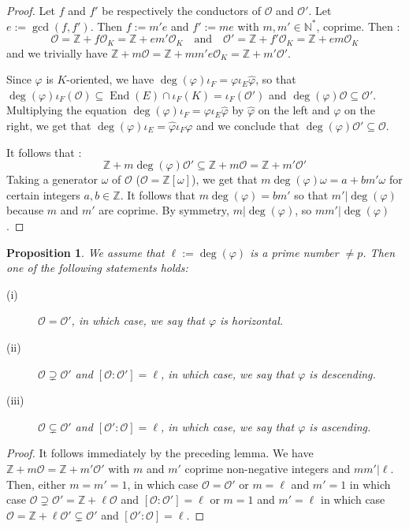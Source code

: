 \documentclass[a4paper,10pt]{report}
\theoremstyle{definition}
\theoremstyle{plain}
\newtheorem{proposition}[definition]{Proposition}
\theoremstyle{definition}
\newcommand{\N}{\mathbb{N}}
\newcommand{\Z}{\mathbb{Z}}
\newcommand{\mO}{\mathcal{O}}
\renewcommand{\(}{\left(}
\renewcommand{\)}{\right)}
\DeclareMathOperator{\End}{End}
\begin{document}
\begin{proof}
Let $f$ and $f'$ be respectively the conductors of $\mO$ and $\mO'$.  Let $e:=\gcd(f,f')$.  Then $f:=m'e$ and $f':=me$ with $m,m'\in\N^*$,  coprime.  Then :
\[\mO=\Z+f\mO_K=\Z+em'\mO_K \quad \mbox{and} \quad \mO'=\Z+f'\mO_K=\Z+em\mO_K\]
and we trivially have $\Z+m\mO=\Z+mm'e\mO_K=\Z+m'\mO'$.

Since $\varphi$ is $K$-oriented,  we have $\deg(\varphi)\iota_F=\varphi\iota_E\widehat{\varphi}$,  so that $\deg(\varphi)\iota_F(\mO)\subseteq \End(E)\cap\iota_F(K)=\iota_F(\mO')$ and $\deg(\varphi)\mO\subseteq \mO'$.  Multiplying the equation $\deg(\varphi)\iota_F=\varphi\iota_E\widehat{\varphi}$ by $\widehat{\varphi}$ on the left and $\varphi$ on the right, we get that $\deg(\varphi)\iota_E=\widehat{\varphi}\iota_F\varphi$ and we conclude that $\deg(\varphi)\mO'\subseteq \mO$. 

It follows that :
\[\Z+m\deg(\varphi)\mO'\subseteq \Z+m\mO= \Z+m'\mO'\]
Taking a generator $\omega$ of $\mO$ ($\mO=\Z[\omega]$),  we get that $m\deg(\varphi)\omega=a+bm'\omega$ for certain integers $a,b\in\Z$.  It follows that $m\deg(\varphi)=bm'$ so that $m'|\deg(\varphi)$ because $m$ and $m'$ are coprime.  By symmetry,  $m|\deg(\varphi)$,  so $mm'|\deg(\varphi)$.
\end{proof}

\begin{proposition}\label{proposition 4}
We assume that $\ell:=\deg(\varphi)$ is a prime number $\neq p$.  Then one of the following statements holds:
\begin{description}
\item[(i)] $\mO=\mO'$,  in which case,  we say that $\varphi$ is \emph{horizontal}.
\item[(ii)] $\mO\supsetneq \mO'$ and $[\mO:\mO']=\ell$,  in which case,  we say that $\varphi$ is \emph{descending}. 
\item[(iii)] $\mO\subsetneq \mO'$ and $[\mO':\mO]=\ell$,  in which case,  we say that $\varphi$ is \emph{ascending}. 
\end{description}
\end{proposition}

\begin{proof}
It follows immediately by the preceding lemma.  We have $\Z+m\mO=\Z+m'\mO'$ with $m$ and $m'$ coprime non-negative integers and $mm'|\ell$.  Then,  either $m=m'=1$,  in which case $\mO=\mO'$ or $m=\ell$ and $m'=1$  in which case $\mO\supsetneq \mO'=\Z+\ell\mO$ and $[\mO:\mO']=\ell$ or $m=1$ and $m'=\ell$  in which case $\mO=\Z+\ell\mO'\subsetneq \mO'$ and $[\mO':\mO]=\ell$.
\end{proof}
\end{document}
